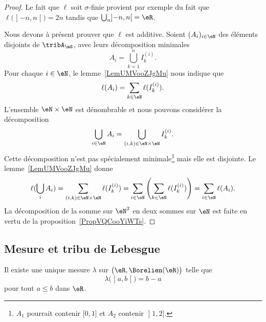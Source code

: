 \begin{proof}
    Le fait que \( \ell\) soit \( \sigma\)-finie provient par exemple du fait que \( \ell\big( \mathopen] -n , n \mathclose[ \big)=2n\) tandis que \( \bigcup_n\mathopen] -n , n \mathclose[=\eR\).

        Nous devons à présent prouver que \( \ell\) est additive. Soient \( (A_i)_{i\in \eN}\) des éléments disjoints de \( \tribA_{\mS}\), avec leurs décomposition minimales
            \begin{equation}
                A_i=\bigcup_{k=1}^nI^{(i)}_k.
            \end{equation}
            Pour chaque \( i\in \eN\), le lemme~\ref{LemUMVooZJgMu} nous indique que
            \begin{equation}
                \ell(A_i)=\sum_{k\in \eN}\ell(I^{(i)}_k).
            \end{equation}
            L'ensemble \( \eN\times \eN\) est dénombrable et nous pouvons considérer la décomposition
            \begin{equation}
                \bigcup_{i\in \eN}A_i=\bigcup_{(i,k)\in \eN\times \eN}I^{(i)}_k.
            \end{equation}
            Cette décomposition n'est pas spécialement minimale\footnote{$ A_1$ pourrait contenir $ \mathopen[ 0 , 1 \mathclose]$ et $ A_2$ contenir $ \mathopen] 1 , 2 \mathclose]$.} mais elle est disjointe.
            Le lemme~\ref{LemUMVooZJgMu} donne
            \begin{equation}
                \ell(\bigcup_i A_i)=\sum_{(i,k)\in \eN\times \eN}\ell(I_k^{(i)})=\sum_{i\in \eN}\left( \sum_{k\in \eN}\ell(I^{(i)}_k)\right)=\sum_{i\in \eN}\ell(A_i).
            \end{equation}
            La décomposition de la somme sur \( \eN^2\) en deux sommes sur \( \eN\) est faite en vertu de la proposition~\ref{PropVQCooYiWTs}.
\end{proof}

\subsection{Mesure et tribu de Lebesgue}

\begin{theorem} \label{ThoDESooEyDOe}
    Il existe une unique mesure \( \lambda\) sur \( \big( \eR,\Borelien(\eR) \big)\) telle que
    \begin{equation}
        \lambda\big( \mathopen] a , b \mathclose[ \big)=b-a
    \end{equation}
    pour tout \( a\leq b\) dans \( \eR\).
\end{theorem}

